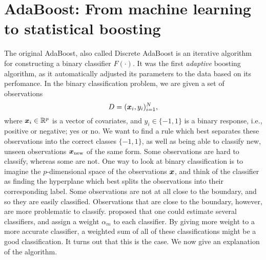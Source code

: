 \section{AdaBoost: From machine learning to statistical boosting}
The original AdaBoost, also called Discrete AdaBoost \citep{adaboost} is an iterative algorithm for constructing a binary classifier $F(\cdot)$.
It was the first \textit{adaptive} boosting algorithm, as it automatically adjusted its parameters to the data based on its perfomance.
In the binary classification problem, we are given a set of observations
\begin{equation*}
    D=(\bm{x}_i,y_i)_{i=1}^N,
\end{equation*}
where $\bm{x}_i\in\mathbb{R}^p$ is a vector of covariates, and $y_i\in\{-1,1\}$ is a binary response, i.e., positive or negative; yes or no.
We want to find a rule which best separates these observations into the correct classes $\{-1,1\}$, as well as being able to classify new, unseen observations $\bm{x}_{\text{new}}$ of the same form.
Some observations are hard to classify, whereas some are not.
One way to look at binary classification is to imagine the $p$-dimensional space of the observations $\bm{x}$, and think of the classifier as finding the hyperplane which best splits the observations into their corresponding label. 
Some observations are not at all close to the boundary, and so they are easily classified.
Observations that are close to the boundary, however, are more problematic to classify.
\citet{adaboost} proposed that one could estimate several classifiers, and assign a weight $\alpha_m$ to each classifier.
By giving more weight to a more accurate classifier, a weighted sum of all of these classifications might be a good classification.
It turns out that this is the case.
We now give an explanation of the algorithm.

